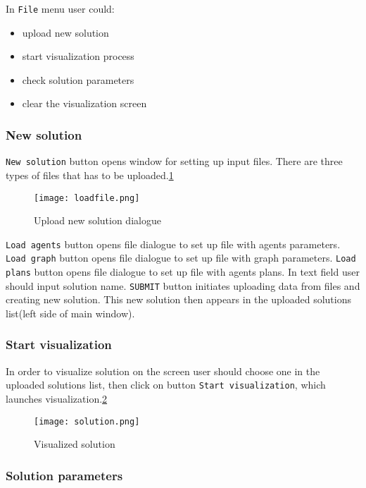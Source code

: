 \documentclass[thesis=B,english]{FITthesis}[2019/12/23]
\begin{document}
In \verb|File| menu user could:
\begin{itemize}
\item upload new solution
\item start visualization process
\item check solution parameters 
\item clear the visualization screen  
\end{itemize}

\subsubsection{New solution}

\verb|New solution| button opens window for setting up input files. There are three types of files that has to be uploaded.\ref{fig:float20}

\begin{figure}
	\texttt{[image: loadfile.png]}
	\caption[Load file]{Upload new solution dialogue}\label{fig:float20}
\end{figure}

\verb|Load agents| button opens file dialogue to set up file with agents parameters. \verb|Load graph| button opens file dialogue to set up file with graph parameters. \verb|Load plans| button opens file dialogue to set up file with agents plans. In text field user should input solution name. \verb|SUBMIT| button initiates uploading data from files and creating new solution. This new solution then appears in the uploaded solutions list(left side of main window). 

\subsubsection{Start visualization}

In order to visualize solution on the screen user should choose one in the uploaded solutions list, then click on button \verb|Start visualization|, which launches visualization.\ref{fig:float21}

\begin{figure}
	\texttt{[image: solution.png]}
	\caption[Start visualization]{Visualized solution}\label{fig:float21}
\end{figure}


\subsubsection{Solution parameters}
\end{document}
